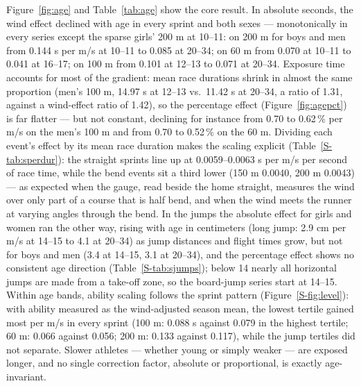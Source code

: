 \documentclass[12pt,a4paper]{article}
\begin{document}
Figure~\ref{fig:age} and Table~\ref{tab:age} show the core result. In absolute seconds, the wind effect declined with age in every sprint and both sexes --- monotonically in every series except the sparse girls' 200 m at 10--11: on 200 m for boys and men from 0.144 s per m/s at 10--11 to 0.085 at 20--34; on 60 m from 0.070 at 10--11 to 0.041 at 16--17; on 100 m from 0.101 at 12--13 to 0.071 at 20--34. Exposure time accounts for most of the gradient: mean race durations shrink in almost the same proportion (men's 100 m, 14.97 s at 12--13 vs.\ 11.42 s at 20--34, a ratio of 1.31, against a wind-effect ratio of 1.42), so the percentage effect (Figure~\ref{fig:agepct}) is far flatter --- but not constant, declining for instance from 0.70 to 0.62\,\% per m/s on the men's 100 m and from 0.70 to 0.52\,\% on the 60 m. Dividing each event's effect by its mean race duration makes the scaling explicit (Table~\ref{S-tab:sperdur}): the straight sprints line up at 0.0059--0.0063 s per m/s per second of race time, while the bend events sit a third lower (150 m 0.0040, 200 m 0.0043) --- as expected when the gauge, read beside the home straight, measures the wind over only part of a course that is half bend, and when the wind meets the runner at varying angles through the bend. In the jumps the absolute effect for girls and women ran the other way, rising with age in centimeters (long jump: 2.9 cm per m/s at 14--15 to 4.1 at 20--34) as jump distances and flight times grow, but not for boys and men (3.4 at 14--15, 3.1 at 20--34), and the percentage effect shows no consistent age direction (Table~\ref{S-tab:sjumps}); below 14 nearly all horizontal jumps are made from a take-off zone, so the board-jump series start at 14--15. Within age bands, ability scaling follows the sprint pattern (Figure~\ref{S-fig:level}): with ability measured as the wind-adjusted season mean, the lowest tertile gained most per m/s in every sprint (100 m: 0.088 s against 0.079 in the highest tertile; 60 m: 0.066 against 0.056; 200 m: 0.133 against 0.117), while the jump tertiles did not separate. Slower athletes --- whether young or simply weaker --- are exposed longer, and no single correction factor, absolute or proportional, is exactly age-invariant.
\end{document}
